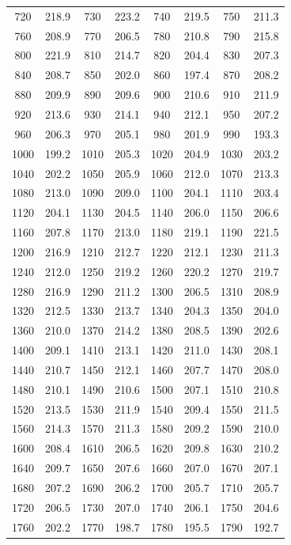 \documentclass[twoside]{mfitjournal}
\begin{document}
\begin{table}[H]
\begin{tabular}{cccccccc}
720 & 218.9 & 730 & 223.2 & 740 & 219.5 & 750 & 211.3 \\
760 & 208.9 & 770 & 206.5 & 780 & 210.8 & 790 & 215.8 \\
800 & 221.9 & 810 & 214.7 & 820 & 204.4 & 830 & 207.3 \\
840 & 208.7 & 850 & 202.0 & 860 & 197.4 & 870 & 208.2 \\
880 & 209.9 & 890 & 209.6 & 900 & 210.6 & 910 & 211.9 \\
920 & 213.6 & 930 & 214.1 & 940 & 212.1 & 950 & 207.2 \\
960 & 206.3 & 970 & 205.1 & 980 & 201.9 & 990 & 193.3 \\
1000 & 199.2 & 1010 & 205.3 & 1020 & 204.9 & 1030 & 203.2 \\
1040 & 202.2 & 1050 & 205.9 & 1060 & 212.0 & 1070 & 213.3 \\
1080 & 213.0 & 1090 & 209.0 & 1100 & 204.1 & 1110 & 203.4 \\
1120 & 204.1 & 1130 & 204.5 & 1140 & 206.0 & 1150 & 206.6 \\
1160 & 207.8 & 1170 & 213.0 & 1180 & 219.1 & 1190 & 221.5 \\
1200 & 216.9 & 1210 & 212.7 & 1220 & 212.1 & 1230 & 211.3 \\
1240 & 212.0 & 1250 & 219.2 & 1260 & 220.2 & 1270 & 219.7 \\
1280 & 216.9 & 1290 & 211.2 & 1300 & 206.5 & 1310 & 208.9 \\
1320 & 212.5 & 1330 & 213.7 & 1340 & 204.3 & 1350 & 204.0 \\
1360 & 210.0 & 1370 & 214.2 & 1380 & 208.5 & 1390 & 202.6 \\
1400 & 209.1 & 1410 & 213.1 & 1420 & 211.0 & 1430 & 208.1 \\
1440 & 210.7 & 1450 & 212.1 & 1460 & 207.7 & 1470 & 208.0 \\
1480 & 210.1 & 1490 & 210.6 & 1500 & 207.1 & 1510 & 210.8 \\
1520 & 213.5 & 1530 & 211.9 & 1540 & 209.4 & 1550 & 211.5 \\
1560 & 214.3 & 1570 & 211.3 & 1580 & 209.2 & 1590 & 210.0 \\
1600 & 208.4 & 1610 & 206.5 & 1620 & 209.8 & 1630 & 210.2 \\
1640 & 209.7 & 1650 & 207.6 & 1660 & 207.0 & 1670 & 207.1 \\
1680 & 207.2 & 1690 & 206.2 & 1700 & 205.7 & 1710 & 205.7 \\
1720 & 206.5 & 1730 & 207.0 & 1740 & 206.1 & 1750 & 204.6 \\
1760 & 202.2 & 1770 & 198.7 & 1780 & 195.5 & 1790 & 192.7 \\

\end{tabular}
\end{table}
\end{document}
